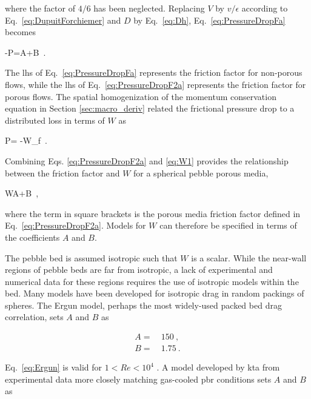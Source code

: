 \noindent where the factor of \(4/6\) has been neglected. Replacing \(V\) by \(v/\epsilon\) according to Eq.\ \eqref{eq:DupuitForchiemer} and \(D\) by Eq.\ \eqref{eq:Dh}, Eq.\ \eqref{eq:PressureDropFa} becomes

\beq
\label{eq:PressureDropF2a}
-\nabla P=A+B\ .
\eeq

\noindent The \gls{lhs} of Eq.\ \eqref{eq:PressureDropFa} represents the friction factor for non-porous flows, while the \gls{lhs} of Eq.\ \eqref{eq:PressureDropF2a} represents the friction factor for porous flows. The spatial homogenization of the momentum conservation equation in Section \ref{sec:macro_deriv} related the frictional pressure drop to a distributed loss in terms of \(W\) as

\beq
\label{eq:W1}
\epsilon\nabla P= -W\rho_f\ .
\eeq

\noindent Combining Eqs. \eqref{eq:PressureDropF2a} and \eqref{eq:W1} provides the relationship between the friction factor and \(W\) for a spherical pebble porous media,

\beq
W\equiv \left\lbrack A+B\right\rbrack{}\ ,
\eeq

\noindent where the term in square brackets is the porous media friction factor defined in Eq.\ \eqref{eq:PressureDropF2a}. Models for \(W\) can therefore be specified in terms of the coefficients \(A\) and \(B\).

The pebble bed is assumed isotropic such that \(W\) is a scalar. While the near-wall regions of pebble beds are far from isotropic, a lack of experimental and numerical data for these regions requires the use of isotropic models within the bed. Many models have been developed for isotropic drag in random packings of spheres. The Ergun model, perhaps the most widely-used packed bed drag correlation, sets \(A\) and \(B\) as \cite{ergun}

\begin{subequations}
\label{eq:Ergun}
\begin{align}
A=&\ 150\ ,\\
B=&\ 1.75\ .
\end{align}
\end{subequations}

\noindent Eq.\ \eqref{eq:Ergun} is valid for \(1<Re<10^4\) \cite{eisfeld,nield,ergun,avigni}. A model developed by \gls{kta} from experimental data more closely matching gas-cooled \gls{pbr} conditions sets \(A\) and \(B\) as \cite{KTA}

